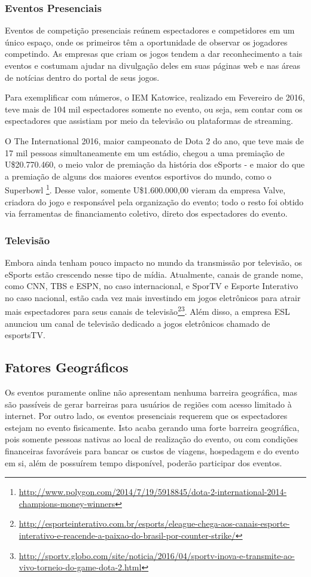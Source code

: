\documentclass[a4paper, 12pt]{paper}
\begin{document}
\subsubsection{Eventos Presenciais}
Eventos de competição presenciais reúnem espectadores e competidores em um único espaço, onde os primeiros têm a oportunidade de observar os jogadores competindo. As empresas que criam os jogos tendem a dar reconhecimento a tais eventos e costumam ajudar na divulgação deles em suas páginas web e nas áreas de notícias dentro do portal de seus jogos.

Para exemplificar com números, o IEM Katowice, realizado em Fevereiro de 2016, teve mais de 104 mil espectadores somente no evento, ou seja, sem contar com os espectadores que assistiam por meio da televisão ou plataformas de streaming.

O The International 2016, maior campeonato de Dota 2 do ano, que teve mais de 17 mil pessoas simultaneamente em um estádio, chegou a uma premiação de U\$20.770.460, o meio valor de premiação da história dos eSports - e maior do que a premiação de alguns dos maiores eventos esportivos do mundo, como o Superbowl \footnote{\url{http://www.polygon.com/2014/7/19/5918845/dota-2-international-2014-champions-money-winners}}. Desse valor, somente U\$1.600.000,00 vieram da empresa Valve, criadora do jogo e responsável pela organização do evento; todo o resto foi obtido via ferramentas de financiamento coletivo, direto dos espectadores do evento.
\subsubsection{Televisão}
Embora ainda tenham pouco impacto no mundo da transmissão por televisão, os eSports estão crescendo nesse tipo de mídia. Atualmente, canais de grande nome, como CNN, TBS e ESPN, no caso internacional, e SporTV e Esporte Interativo no caso nacional, estão cada vez mais investindo em jogos eletrônicos para atrair mais espectadores para seus canais de televisão\footnote{\url{http://esporteinterativo.com.br/esports/eleague-chega-aos-canais-esporte-interativo-e-reacende-a-paixao-do-brasil-por-counter-strike/}}\footnote{\url{http://sportv.globo.com/site/noticia/2016/04/sportv-inova-e-transmite-ao-vivo-torneio-do-game-dota-2.html}}. Além disso, a empresa ESL anunciou um canal de televisão dedicado a jogos eletrônicos chamado de esportsTV.
\subsection{Fatores Geográficos}
Os eventos puramente online não apresentam nenhuma barreira geográfica, mas são passíveis de gerar barreiras para usuários de regiões com acesso limitado à internet. Por outro lado, os eventos presenciais requerem que os espectadores estejam no evento fisicamente. Isto acaba gerando uma forte barreira geográfica, pois somente pessoas nativas ao local de realização do evento, ou com condições financeiras favoráveis para bancar os custos de viagens, hospedagem e do evento em si, além de possuírem tempo disponível, poderão participar dos eventos.
\end{document}
